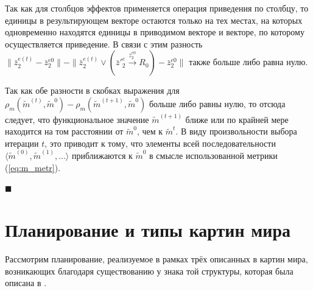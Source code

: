 \documentclass[a4paper, 12pt]{article}
\theoremstyle{plain}
\newenvironment{Proof}%
	{\par\noindent{\bf Доказательство.}}%
	{\hfill$\scriptstyle\blacksquare$}
\begin{document}
\begin{Proof}
		Так как для столбцов эффектов применяется операция приведения по столбцу, то единицы в результирующем векторе остаются только на тех местах, на которых одновременно находятся единицы в приводимом векторе и векторе, по которому осуществляется приведение. В связи с этим разность $\|\bar z_2^{e(t)}-\bar z_2^{e0}\|-\|\bar z_2^{e(t)}\vee (\bar z'^e_2\xrightarrow{\bar z_2^{e0}} R_0)-\bar z_2^{e0}\|$ также больше либо равна нулю.
		
		Так как обе разности в скобках выражения для $\rho_m(\tilde m^{(t)},\tilde m^0)-\rho_m(\tilde m^{(t+1)},\tilde m^0)$ больше либо равны нулю, то отсюда следует, что функциональное значение $\tilde m^{(t+1)}$ ближе или по крайней мере находится на том расстоянии от $\tilde m^0$, чем к $\tilde m^{t}$. В виду произвольности выбора итерации $t$, это приводит к тому, что элементы всей последовательности $\langle\tilde m^{(0)},\tilde m^{(1)},\dots\rangle$ приближаются к $\tilde m^0$ в смысле использованной метрики (\ref{eq:m_metr}). 

	\end{Proof}
	
	\section{Планирование и типы картин мира} Рассмотрим планирование, реализуемое в рамках трёх описанных в \cite{Chudova2012a} картин мира, возникающих благодаря существованию у знака той структуры, которая была описана в \cite{PanovA2014a}.
	
\end{document}
